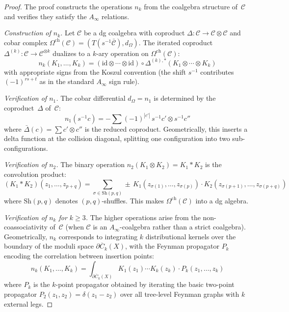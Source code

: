 \begin{proof}
The proof constructs the operations $n_k$ from the coalgebra structure of~$\mathcal{C}$ and verifies they satisfy the $A_\infty$ relations.

\emph{Construction of $n_k$.}
Let $\mathcal{C}$ be a dg coalgebra with coproduct $\Delta: \mathcal{C} \to \mathcal{C} \otimes \mathcal{C}$ and cobar complex $\Omega^{\mathrm{ch}}(\mathcal{C}) = (T(s^{-1}\bar{\mathcal{C}}), d_\Omega)$.  The iterated coproduct $\Delta^{(k)}: \mathcal{C} \to \mathcal{C}^{\otimes k}$ dualizes to a $k$-ary operation on $\Omega^{\mathrm{ch}}(\mathcal{C})$:
\begin{equation}\label{eq:nk-from-coproduct}
n_k(K_1, \ldots, K_k) = (\mathrm{id} \otimes \cdots \otimes \mathrm{id}) \circ \Delta^{(k),*}(K_1 \otimes \cdots \otimes K_k)
\end{equation}
with appropriate signs from the Koszul convention (the shift $s^{-1}$ contributes $(-1)^{rs+t}$ as in the standard $A_\infty$ sign rule).

\emph{Verification of $n_1$.}
The cobar differential $d_\Omega = n_1$ is determined by the coproduct~$\Delta$ of~$\mathcal{C}$:
\[
n_1(s^{-1}c) = -\sum (-1)^{|c'|}\, s^{-1}c' \otimes s^{-1}c''
\]
where $\bar{\Delta}(c) = \sum c' \otimes c''$ is the reduced coproduct.  Geometrically, this inserts a delta function at the collision diagonal, splitting one configuration into two sub-configurations.

\emph{Verification of $n_2$.}
The binary operation $n_2(K_1 \otimes K_2) = K_1 * K_2$ is the convolution product:
\[
(K_1 * K_2)(z_1, \ldots, z_{p+q}) = \sum_{\sigma \in \mathrm{Sh}(p,q)} \pm\, K_1(z_{\sigma(1)}, \ldots, z_{\sigma(p)}) \cdot K_2(z_{\sigma(p+1)}, \ldots, z_{\sigma(p+q)})
\]
where $\mathrm{Sh}(p,q)$ denotes $(p,q)$-shuffles.  This makes $\Omega^{\mathrm{ch}}(\mathcal{C})$ into a dg algebra.

\emph{Verification of $n_k$ for $k \geq 3$.}
The higher operations arise from the non-coassociativity of~$\mathcal{C}$ (when $\mathcal{C}$ is an $A_\infty$-coalgebra rather than a strict coalgebra).  Geometrically, $n_k$ corresponds to integrating $k$ distributional kernels over the boundary of the moduli space $\partial\overline{C}_k(X)$, with the Feynman propagator $P_k$ encoding the correlation between insertion points:
\[
n_k(K_1, \ldots, K_k) = \int_{\partial \overline{C}_k(X)} K_1(z_1) \cdots K_k(z_k) \cdot P_k(z_1, \ldots, z_k)
\]
where $P_k$ is the $k$-point propagator obtained by iterating the basic
two-point propagator $P_2(z_1, z_2) = \delta(z_1 - z_2)$ over all
tree-level Feynman graphs with $k$ external legs.


\end{proof}
